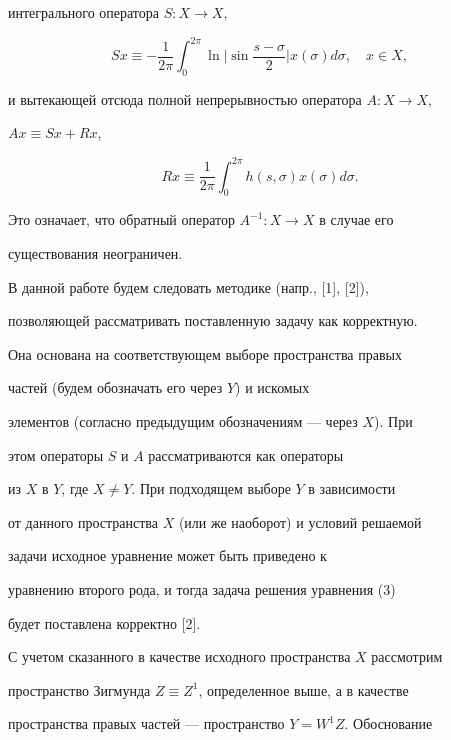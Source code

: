 интегрального оператора $S:X\to X$, 


$$ 


S x\equiv-\frac{1}{2\pi}\int^{2\pi}_0\ln\bigg|\sin 


\frac{s-\sigma}{2}\bigg|x(\sigma)d\sigma,\quad x\in X, 


$$ 


и вытекающей отсюда полной непрерывностью оператора $A:X\to X$, 


$Ax\equiv S x+R x$, 


\begin{equation} 


R x\equiv\frac{1}{2\pi}\int^{2\pi}_0 h(s,\sigma)x(\sigma)d\sigma. 


\end{equation} 


Это означает, что обратный оператор $A^{-1}:X\to X$ в случае его 


существования неограничен. 


 


В данной работе будем следовать методике (напр., [1], [2]), 


позволяющей рассматривать поставленную задачу как корректную. 


Она основана на соответствующем выборе пространства правых 


частей (будем обозначать его через $Y$) и искомых 


элементов (согласно предыдущим обозначениям --- через $X$). При 


этом операторы $S$ и $A$ рассматриваются как операторы 


из $X$ в $Y$, где $X\ne Y$. При подходящем выборе $Y$ в зависимости 


от данного пространства $X$ (или же наоборот) и условий решаемой 


задачи исходное уравнение может быть приведено к 


уравнению второго рода, и тогда задача решения уравнения (3) 


будет поставлена корректно [2]. 


 


С учетом сказанного в качестве исходного пространства $X$ рассмотрим 


пространство Зигмунда $Z\equiv Z^1$, определенное выше, а в качестве 


пространства правых частей --- пространство $Y=W^1Z$. Обоснование 


